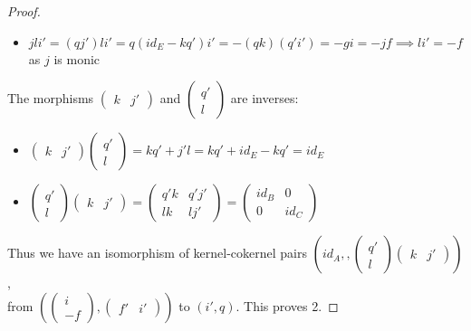 \begin{proof}
\begin{itemize}
            \item $jli'=(qj')li'=q(id_E-kq')i'=-(qk)(q'i')=-gi=-jf \implies li'=-f$ as $j$ is monic
        \end{itemize}
        The morphisms $\begin{pmatrix}
            k & j'
        \end{pmatrix}$ and $\begin{pmatrix}
            q' \\ l
        \end{pmatrix}$ are inverses:
        \begin{itemize}
            \item $\begin{pmatrix}
                k & j'
            \end{pmatrix}\begin{pmatrix}
                q' \\ l
            \end{pmatrix}=kq'+j'l=kq'+id_E-kq'=id_E$
            \item $\begin{pmatrix}
                q' \\ l
            \end{pmatrix}\begin{pmatrix}
                k & j'
            \end{pmatrix}=\begin{pmatrix}
                q'k & q'j' \\ lk & lj'
            \end{pmatrix} = \begin{pmatrix}
                id_B & 0 \\ 0 & id_C
            \end{pmatrix}$
        \end{itemize}
        Thus we have an isomorphism of kernel-cokernel pairs $(id_A,,\begin{pmatrix}
            q' \\ l
        \end{pmatrix}\begin{pmatrix}
            k & j'
        \end{pmatrix})$, \\ from $(\begin{pmatrix}i \\ -f\end{pmatrix},\begin{pmatrix}f' & i'\end{pmatrix})$ to $(i',q)$. This proves 2.
    \end{proof}


